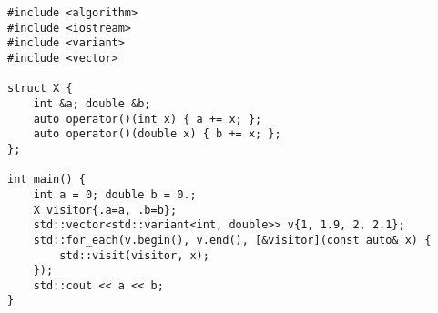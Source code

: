 \begin{lstlisting}[title=\href{https://godbolt.org/z/E6SNXT}{\texttt{godbolt.org/z/E6SNXT}}]
#include <algorithm>
#include <iostream>
#include <variant>
#include <vector>

struct X {
    int &a; double &b;
    auto operator()(int x) { a += x; };
    auto operator()(double x) { b += x; };
};

int main() {
    int a = 0; double b = 0.;
    X visitor{.a=a, .b=b};
    std::vector<std::variant<int, double>> v{1, 1.9, 2, 2.1};
    std::for_each(v.begin(), v.end(), [&visitor](const auto& x) {
        std::visit(visitor, x);
    });
    std::cout << a << b;
}
\end{lstlisting}
